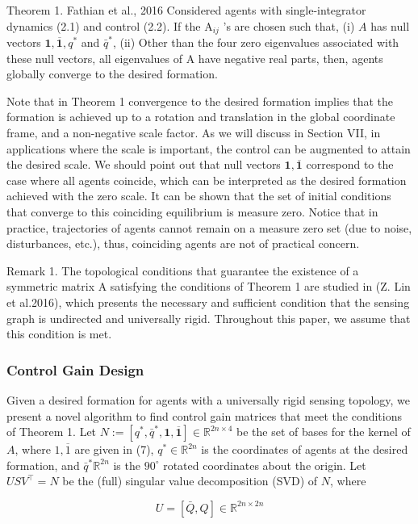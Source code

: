 \documentclass[10pt]{article}
\begin{document}
Theorem 1. Fathian et al., 2016 Considered agents with single-integrator dynamics (2.1) and control (2.2). If the $\mathrm{A}_{i j}$ 's are chosen such that, (i) $A$ has null vectors $\mathbf{1}, \overline{\mathbf{1}}, q^{*}$ and $\bar{q}^{*}$, (ii) Other than the four zero eigenvalues associated with these null vectors, all eigenvalues of A have negative real parts, then, agents globally converge to the desired formation.

Note that in Theorem 1 convergence to the desired formation implies that the formation is achieved up to a rotation and translation in the global coordinate frame, and a non-negative scale factor. As we will discuss in Section VII, in applications where the scale is important, the control can be augmented to attain the desired scale. We should point out that null vectors $\mathbf{1}, \overline{\mathbf{1}}$ correspond to the case where all agents coincide, which can be interpreted as the desired formation achieved with the zero scale. It can be shown that the set of initial conditions that converge to this coinciding equilibrium is measure zero. Notice that in practice, trajectories of agents cannot remain on a measure zero set (due to noise, disturbances, etc.), thus, coinciding agents are not of practical concern.

Remark 1. The topological conditions that guarantee the existence of a symmetric matrix A satisfying the conditions of Theorem 1 are studied in (Z. Lin et al.2016), which presents the necessary and sufficient condition that the sensing graph is undirected and universally rigid. Throughout this paper, we assume that this condition is met.

\subsubsection{Control Gain Design}
Given a desired formation for agents with a universally rigid sensing topology, we present a novel algorithm to find control gain matrices that meet the conditions of Theorem 1. Let $N:=\left[q^{*}, \bar{q}^{*}, \mathbf{1}, \overline{\mathbf{1}}\right] \in \mathbb{R}^{2 n \times 4}$ be the set of bases for the kernel of $A$, where $1, \overline{1}$ are given in (7), $q^{*} \in \mathbb{R}^{2 n}$ is the coordinates of agents at the desired formation, and $\bar{q}^{*} \mathbb{R}^{2 n}$ is the $90^{\circ}$ rotated coordinates about the origin. Let $U S V^{\top}=N$ be the (full) singular value decomposition (SVD) of $N$, where

$$
U=[\bar{Q}, Q] \in \mathbb{R}^{2 n \times 2 n}
$$
\end{document}
